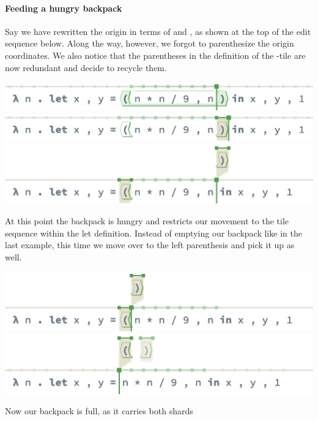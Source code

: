 \paragraph{Feeding a hungry backpack}
Say we have rewritten the origin in terms of
 and , as shown at the top of the
edit sequence below.
Along the way, however, we forgot to parenthesize
the origin coordinates.
We also notice that the parentheses in the definition
of the -tile are now redundant and decide
to recycle them.
\begin{center}
  \includegraphics[width=\columnwidth]{img/multi-restructure-0.png}
  \includegraphics[width=\columnwidth]{img/multi-restructure-1.png}
  \includegraphics[width=\columnwidth]{img/multi-restructure-2.png}
\end{center}
At this point the backpack is hungry and restricts
our movement to the tile sequence within the
let definition.
Instead of emptying our backpack like in the
last example, this time we move over to the
left parenthesis and pick it up as well.
\begin{center}
  \includegraphics[width=\columnwidth]{img/multi-restructure-3.png}
  \includegraphics[width=\columnwidth]{img/multi-restructure-4.png}
\end{center}
Now our backpack is full, as it carries both shards
